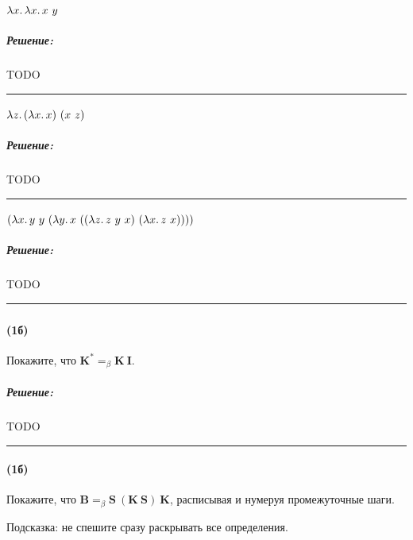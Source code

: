 \documentclass{article}
\newenvironment{proof}{\subparagraph{\hspace{-1em}Решение:\newline}}{\par\noindent\rule{\textwidth}{0.4pt}}
\newcommand{\comb}[1]{\mathbf{#1}}
\newcommand{\eqbeta}{=_\beta}
\begin{document}
    \paragraph{}

    $\lambda x \ldotp \lambda x \ldotp x~y$

    \begin{proof}
        TODO %
    \end{proof}

    \paragraph{}

    $\lambda z \ldotp (\lambda x \ldotp x)~(x~z)$

    \begin{proof}
        TODO %
    \end{proof}

    \paragraph{}

    $(\lambda x\ldotp y~y~(\lambda y\ldotp x~((\lambda z\ldotp z~y~x)~(\lambda x\ldotp z~x))))$

    \begin{proof}
        TODO %
    \end{proof}

    \subsubsection{}

    \paragraph{(1б)}

    Покажите, что $\comb{K}^* \eqbeta \comb{K}~\comb{I}$.

    \begin{proof}
        TODO %
    \end{proof}

    \paragraph{(1б)}

    Покажите, что $\comb{B} \eqbeta \comb{S}~(\comb{K}~\comb{S})~\comb{K}$, расписывая и нумеруя промежуточные шаги.

    Подсказка: не спешите сразу раскрывать все определения.
\end{document}
